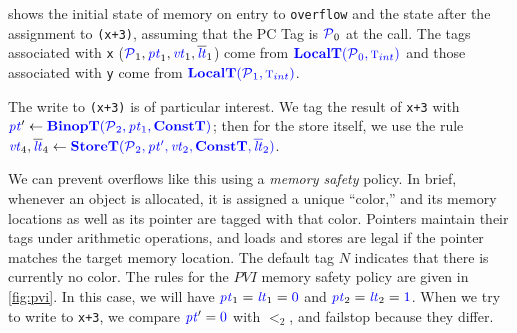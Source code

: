 \documentclass{llncs}
\begin{document}


 shows the initial state of memory on entry to {\tt overflow} and the state after
the assignment to {\tt *(x+3)}, assuming that the PC Tag is \(\PCT_0\) at the call. The tags associated
with {\tt x} (\(\PCT_1,\pt_1,\vt_1,\lts_1\)) come from \(\localtname(\PCT_0,\TN[int])\) and those
associated with {\tt y} come from \(\localtname(\PCT_1,\TN[int])\).

The write to {\tt *(x+3)} is of particular interest. We tag the result of {\tt x+3}
with \(\pt' \leftarrow \binoptname(\PCT_2, \pt_1, \constt)\); then for the store itself,
we use the rule \(\vt_4, \lts_4 \leftarrow \storetname(\PCT_2, \pt', \vt_2, \constt, \lts_2)\).

We can prevent overflows like this using a {\em memory safety} policy. In brief, whenever
an object is allocated, it is assigned a unique ``color,'' and its memory locations as well
as its pointer are tagged with that color. Pointers maintain their tags under arithmetic
operations, and loads and stores are legal if the pointer matches the target memory location.
The default tag \(N\) indicates that there is currently no color.
The rules for the \(PVI\) memory safety policy are given in \cref{fig:pvi}. In this case, we will
have \(\pt_1 = \lt_1 = \tagz\) and \(\pt_2 = \lt_2 = \tagone\). When we try to write to {\tt x+3},
we compare \(\pt' = \tagz\) with \(\lt_2\), and failstop because they differ.
\end{document}
